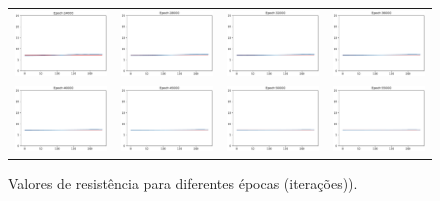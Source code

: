 \documentclass{aleph-revista}
\begin{document}
\begin{figure}[!ht]
\begin{tabular}{cccc}
    \includegraphics[width=0.22\linewidth]{res_24000} &
    \includegraphics[width=0.22\linewidth]{res_28000} &
    \includegraphics[width=0.22\linewidth]{res_32000} &
    \includegraphics[width=0.22\linewidth]{res_36000}   \\

    \includegraphics[width=0.22\linewidth]{res_40000} &
    \includegraphics[width=0.22\linewidth]{res_45000} &
    \includegraphics[width=0.22\linewidth]{res_50000} &
    \includegraphics[width=0.22\linewidth]{res_55000}   \\
  \end{tabular}
  \caption{Valores de resistência para diferentes épocas (iterações)).}
  \label{fig:resist_table}
\end{figure}
\end{document}

